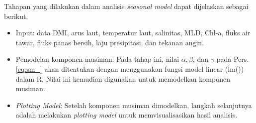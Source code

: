 \begin{spacing}{1.5}
\begin{itemize}
		Tahapan yang dilakukan dalam analisis \textit{seasonal model} dapat dijelaskan sebagai berikut.
		\begin{itemize}
			\item Input: data DMI, arus laut, temperatur laut, salinitas, MLD, Chl-a, fluks air tawar, fluks panas bersih, laju presipitasi, dan tekanan angin.
			\item Pemodelan komponen musiman: Pada tahap ini, nilai $\alpha, \beta$, dan $\gamma$ pada Pers. \ref{eq:sm_} akan ditentukan dengan menggunakan fungsi model linear (lm()) dalam R. Nilai ini kemudian digunakan untuk memodelkan komponen musiman.
			\item \textit{Plotting Model}: Setelah komponen musiman dimodelkan, langkah selanjutnya adalah melakukan \textit{plotting model} untuk memvisualisasikan hasil analisis.
		\end{itemize}
		

\end{itemize}
\end{spacing}
